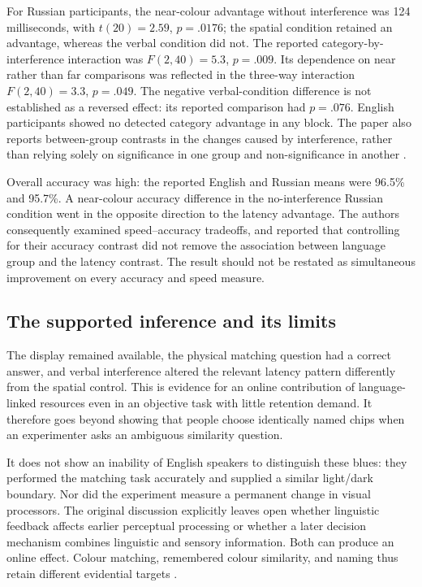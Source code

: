 For Russian participants, the near-colour advantage without interference
was 124 milliseconds, with \(t(20)=2.59\), \(p=.0176\); the spatial
condition retained an advantage, whereas the verbal condition did not.
The reported category-by-interference interaction was
\(F(2,40)=5.3\), \(p=.009\). Its dependence on near rather than far
comparisons was reflected in the three-way interaction
\(F(2,40)=3.3\), \(p=.049\).
The negative verbal-condition difference is not established as a reversed
effect: its reported comparison had \(p=.076\).
English participants showed no detected category advantage in any block.
The paper also reports between-group contrasts in the changes caused by
interference, rather than relying solely on significance in one group and
non-significance in another
\cite[pp.~7782--7783,Table~1]{WinawerEtAl2007RussianBluesLC}.

Overall accuracy was high: the reported English and Russian means were
96.5\% and 95.7\%. A near-colour accuracy difference in the no-interference
Russian condition went in the opposite direction to the latency advantage.
The authors consequently examined speed--accuracy tradeoffs, and reported
that controlling for their accuracy contrast did not remove the association
between language group and the latency contrast. The result should not be
restated as simultaneous improvement on every accuracy and speed measure.

\subsection{The supported inference and its limits}

The display remained available, the physical matching question had a
correct answer, and verbal interference altered the relevant latency
pattern differently from the spatial control. This is evidence for an
online contribution of language-linked resources even in an objective
task with little retention demand. It therefore goes beyond showing that
people choose identically named chips when an experimenter asks an
ambiguous similarity question.

It does not show an inability of English speakers to distinguish these
blues: they performed the matching task accurately and supplied a similar
light/dark boundary. Nor did the experiment measure a permanent change in
visual processors. The original discussion explicitly leaves open whether
linguistic feedback affects earlier perceptual processing or whether a later
decision mechanism combines linguistic and sensory information. Both can
produce an online effect. Colour matching, remembered colour similarity,
and naming thus retain different evidential targets
\cite[pp.~7783--7785]{WinawerEtAl2007RussianBluesLC}.

